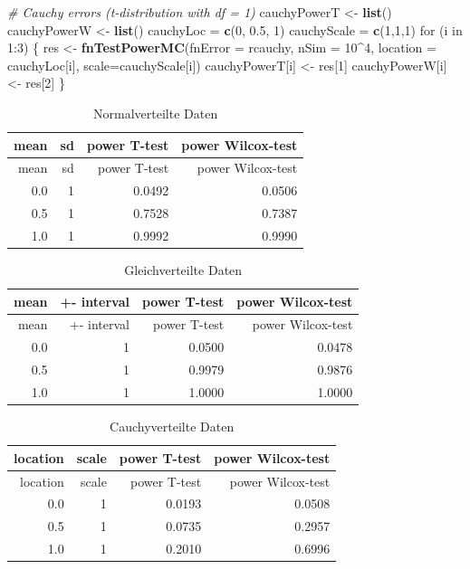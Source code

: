 \documentclass[10pt,]{article}
\newenvironment{Shaded}{\begin{snugshade}}{\end{snugshade}}
\newcommand{\KeywordTok}[1]{\textcolor[rgb]{0.13,0.29,0.53}{\textbf{{#1}}}}
\newcommand{\DataTypeTok}[1]{\textcolor[rgb]{0.13,0.29,0.53}{{#1}}}
\newcommand{\DecValTok}[1]{\textcolor[rgb]{0.00,0.00,0.81}{{#1}}}
\newcommand{\FloatTok}[1]{\textcolor[rgb]{0.00,0.00,0.81}{{#1}}}
\newcommand{\StringTok}[1]{\textcolor[rgb]{0.31,0.60,0.02}{{#1}}}
\newcommand{\CommentTok}[1]{\textcolor[rgb]{0.56,0.35,0.01}{\textit{{#1}}}}
\newcommand{\NormalTok}[1]{{#1}}
\begin{document}
\begin{Shaded}
\begin{Highlighting}[]
\CommentTok{# Cauchy errors (t-distribution with df = 1)}
\NormalTok{cauchyPowerT <-}\StringTok{ }\KeywordTok{list}\NormalTok{()}
\NormalTok{cauchyPowerW <-}\StringTok{ }\KeywordTok{list}\NormalTok{()}
\NormalTok{cauchyLoc =}\StringTok{ }\KeywordTok{c}\NormalTok{(}\DecValTok{0}\NormalTok{, }\FloatTok{0.5}\NormalTok{, }\DecValTok{1}\NormalTok{)}
\NormalTok{cauchyScale =}\StringTok{ }\KeywordTok{c}\NormalTok{(}\DecValTok{1}\NormalTok{,}\DecValTok{1}\NormalTok{,}\DecValTok{1}\NormalTok{)}
\NormalTok{for (i in }\DecValTok{1}\NormalTok{:}\DecValTok{3}\NormalTok{) \{}
  \NormalTok{res <-}\StringTok{ }\KeywordTok{fnTestPowerMC}\NormalTok{(}\DataTypeTok{fnError =} \NormalTok{rcauchy, }\DataTypeTok{nSim =} \DecValTok{10}\NormalTok{^}\DecValTok{4}\NormalTok{,}
                       \DataTypeTok{location =} \NormalTok{cauchyLoc[i], }\DataTypeTok{scale=}\NormalTok{cauchyScale[i])}
  \NormalTok{cauchyPowerT[i] <-}\StringTok{ }\NormalTok{res[}\DecValTok{1}\NormalTok{]}
  \NormalTok{cauchyPowerW[i] <-}\StringTok{ }\NormalTok{res[}\DecValTok{2}\NormalTok{]}
\NormalTok{\}}
\end{Highlighting}
\end{Shaded}

\begin{longtable}[]{@{}rrrr@{}}
\caption{Normalverteilte Daten}\tabularnewline
\toprule
mean & sd & power T-test & power Wilcox-test\tabularnewline
\midrule
\endfirsthead
\toprule
mean & sd & power T-test & power Wilcox-test\tabularnewline
\midrule
\endhead
0.0 & 1 & 0.0492 & 0.0506\tabularnewline
0.5 & 1 & 0.7528 & 0.7387\tabularnewline
1.0 & 1 & 0.9992 & 0.9990\tabularnewline
\bottomrule
\end{longtable}

\begin{longtable}[]{@{}rrrr@{}}
\caption{Gleichverteilte Daten}\tabularnewline
\toprule
mean & +- interval & power T-test & power Wilcox-test\tabularnewline
\midrule
\endfirsthead
\toprule
mean & +- interval & power T-test & power Wilcox-test\tabularnewline
\midrule
\endhead
0.0 & 1 & 0.0500 & 0.0478\tabularnewline
0.5 & 1 & 0.9979 & 0.9876\tabularnewline
1.0 & 1 & 1.0000 & 1.0000\tabularnewline
\bottomrule
\end{longtable}

\begin{longtable}[]{@{}rrrr@{}}
\caption{Cauchyverteilte Daten}\tabularnewline
\toprule
location & scale & power T-test & power Wilcox-test\tabularnewline
\midrule
\endfirsthead
\toprule
location & scale & power T-test & power Wilcox-test\tabularnewline
\midrule
\endhead
0.0 & 1 & 0.0193 & 0.0508\tabularnewline
0.5 & 1 & 0.0735 & 0.2957\tabularnewline
1.0 & 1 & 0.2010 & 0.6996\tabularnewline
\bottomrule
\end{longtable}
\end{document}
